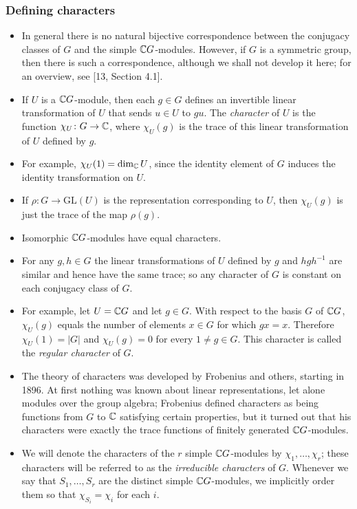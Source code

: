 \documentclass[../Odyssey_Project.tex]{subfiles}
\begin{document}
\subsubsection*{Defining characters}
\begin{itemize}
    \item In general there is no natural bijective correspondence between the conjugacy classes of $G$ and the simple $\mathbb{C} G$-modules. However, if $G$ is a symmetric group, then there is such a correspondence, although we shall not develop it here; for an overview, see [13, Section 4.1].
    \item If $U$ is a $\mathbb{C} G$-module, then each $g \in G$ defines an invertible linear transformation of $U$ that sends $u \in U$ to $gu$. The \emph{character} of $U$ is the function $\chi_U \colon G \to \mathbb{C}$, where $\chi_U(g)$ is the trace of this linear transformation of $U$ defined by $g$.
    \item For example, $\chi_U(1) = \dim_{\mathbb{C}} U$, since the identity element of $G$ induces the identity transformation on $U$.
    \item If $\rho \colon G \to \mathrm{GL}(U)$ is the representation corresponding to $U$, then $\chi_U(g)$ is just the trace of the map $\rho(g)$.
    \item Isomorphic $\mathbb{C} G$-modules have equal characters.
    \item For any $g, h \in G$ the linear transformations of $U$ defined by $g$ and $hgh^{-1}$ are similar and hence have the same trace; so any character of $G$ is constant on each conjugacy class of $G$.
    \item For example, let $U = \mathbb{C} G$ and let $g \in G$. With respect to the basis $G$ of $\mathbb{C} G$, $\chi_U(g)$ equals the number of elements $x \in G$ for which $gx = x$. Therefore $\chi_U(1) = |G|$ and $\chi_U(g) = 0$ for every $1 \neq g \in G$. This character is called the \emph{regular character} of $G$.
    \item The theory of characters was developed by Frobenius and others, starting in 1896. At first nothing was known about linear representations, let alone modules over the group algebra; Frobenius defined characters as being functions from $G$ to $\mathbb{C}$ satisfying certain properties, but it turned out that his characters were exactly the trace functions of finitely generated $\mathbb{C} G$-modules.
    \item We will denote the characters of the $r$ simple $\mathbb{C} G$-modules by $\chi_1, \ldots, \chi_r$; these characters will be referred to as the \emph{irreducible characters} of $G$. Whenever we say that $S_1, \ldots, S_r$ are the distinct simple $\mathbb{C} G$-modules, we implicitly order them so that $\chi_{S_i} = \chi_i$ for each $i$.

\end{itemize}
\end{document}
